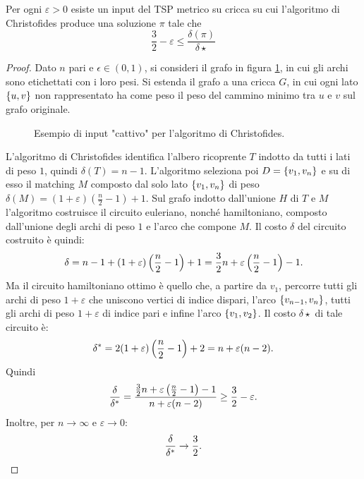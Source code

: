\begin{theorem}
	Per ogni $\varepsilon>0$ esiste un input del TSP metrico su cricca su cui l'algoritmo di Christofides produce una soluzione $\pi$ tale che
	\begin{equation*}
		\frac 3 2-\varepsilon \leq \frac{\delta(\pi)}{\delta\star}
	\end{equation*}
\end{theorem}
\begin{proof}
	Dato $n$ pari e $\epsilon\in(0,1)$, si consideri il grafo in figura \ref{fig:christotight}, in cui gli archi sono etichettati con i loro pesi. Si estenda il grafo a una cricca $G$, in cui ogni lato $\set{u,v}$ non rappresentato ha come peso il peso del cammino minimo tra $u$ e $v$ sul grafo originale.

	\begin{figure}[ht]
		\centering
		
		\caption{Esempio di input "cattivo" per l'algoritmo di Christofides.}
		\label{fig:christotight}
	\end{figure}

	L'algoritmo di Christofides identifica l'albero ricoprente $T$ indotto da tutti i lati di peso $1$, quindi $\delta(T)=n-1$.
	L'algoritmo seleziona poi $D=\set{v_1,v_n}$ e su di esso il matching $M$ composto dal solo lato $\set{v_1,v_n}$ di peso $\delta(M)=(1+\varepsilon)\left(\frac n2-1\right)+1$.
	Sul grafo indotto dall'unione $H$ di $T$ e $M$ l'algoritmo costruisce il circuito euleriano, nonché hamiltoniano, composto dall'unione degli archi di peso $1$ e l'arco che compone $M$.
	Il costo $\delta$ del circuito costruito è quindi:
	\begin{equation*}
		\delta = n-1 + (1+\varepsilon)\left(\frac n2-1\right)+1 = \frac32n+\varepsilon\left(\frac n2-1\right)-1 \text.
	\end{equation*}
	Ma il circuito hamiltoniano ottimo è quello che, a partire da $v_1$, percorre tutti gli archi di peso $1+\varepsilon$ che uniscono vertici di indice dispari, l'arco $\set{v_{n-1},v_n}$, tutti gli archi di peso $1+\varepsilon$ di indice pari e infine l'arco $\set{v_1,v_2}$.
	Il costo $\delta\star$ di tale circuito è:
	\begin{equation*}
		\delta\star = 2(1+\varepsilon)\left(\frac n2-1\right) + 2 = n+\varepsilon(n-2) \text.
	\end{equation*}
	Quindi
	\begin{equation*}
		\frac{\delta}{\delta\star} = \frac{\frac32n+\varepsilon\left(\frac n2-1\right)-1}{n+\varepsilon(n-2)} \geq \frac 3 2-\varepsilon \text.
	\end{equation*}
	Inoltre, per $n\to\infty$ e $\varepsilon\to0$:
	\begin{equation*}
		\frac{\delta}{\delta\star} \to \frac 3 2 \text.
	\end{equation*}
\end{proof}


